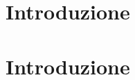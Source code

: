 \documentclass{article}
\begin{document}


\section{Introduzione}
\label{sec:introduzione}


\newpage

\section{Introduzione}
\label{sec:processi-primari}

\end{document}
